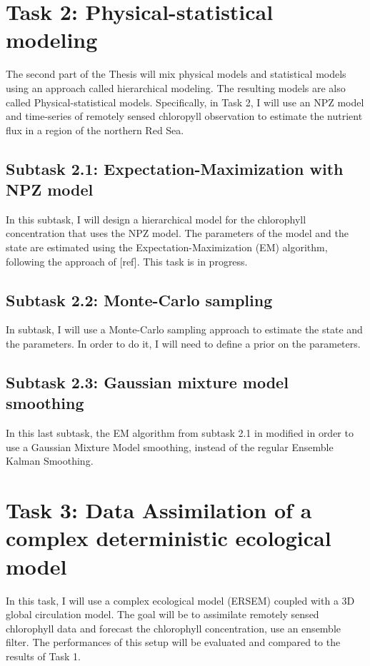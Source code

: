 	\section{Task 2: Physical-statistical modeling}
	\label{physstat}

		The second part of the Thesis will mix physical models and statistical models using an approach called hierarchical modeling. The resulting models are also called Physical-statistical models. Specifically, in Task 2, I will use an NPZ model and time-series of remotely sensed chloropyll observation to estimate the nutrient flux in a region of the northern Red Sea.

		\subsection{Subtask 2.1: Expectation-Maximization with NPZ model}
		\label{physstat:EM}

			In this subtask, I will design a hierarchical model for the chlorophyll concentration that uses the NPZ model. The parameters of the model and the state are estimated using the Expectation-Maximization (EM) algorithm, following the approach of [ref]. This task is in progress. 
			

		\subsection{Subtask 2.2: Monte-Carlo sampling}
		\label{physstat:bayes}

			In subtask, I will use a Monte-Carlo sampling approach to estimate the state and the parameters. In order to do it, I will need to define a prior on the parameters. 

		\subsection{Subtask 2.3: Gaussian mixture model smoothing}
		\label{physstat:GM}

			In this last subtask, the EM algorithm from subtask 2.1 in modified in order to use a Gaussian Mixture Model smoothing, instead of the regular Ensemble Kalman Smoothing.  

	\section{Task 3: Data Assimilation of a complex deterministic ecological model}
	\label{moddriv}

		In this task, I will use a complex ecological model (ERSEM) coupled with a 3D global circulation model. The goal will be to assimilate remotely sensed chlorophyll data and forecast the chlorophyll concentration, use an ensemble filter. The performances of this setup will be evaluated and compared to the results of Task 1.
